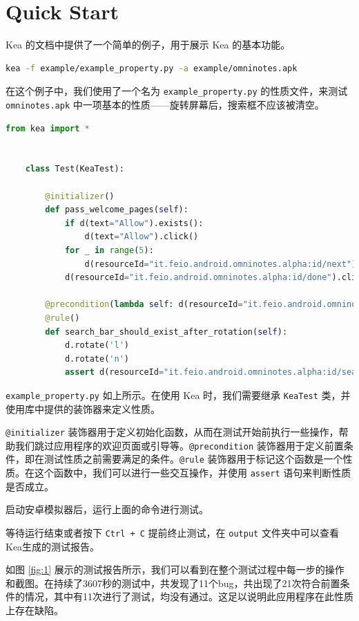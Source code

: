 \documentclass{article}
\begin{document}
\section{Quick Start}

Kea 的文档中提供了一个简单的例子，用于展示 Kea 的基本功能。

\begin{lstlisting}[language=bash]
    kea -f example/example_property.py -a example/omninotes.apk
\end{lstlisting}

在这个例子中，我们使用了一个名为 \texttt{example\_property.py} 的性质文件，来测试 \texttt{omninotes.apk} 中一项基本的性质——旋转屏幕后，搜索框不应该被清空。


\begin{lstlisting}[language=python]
    from kea import *


    class Test(KeaTest): 

        @initializer()
        def pass_welcome_pages(self):
            if d(text="Allow").exists():
                d(text="Allow").click()
            for _ in range(5):
                d(resourceId="it.feio.android.omninotes.alpha:id/next").click()
            d(resourceId="it.feio.android.omninotes.alpha:id/done").click()
    
        @precondition(lambda self: d(resourceId="it.feio.android.omninotes.alpha:id/search_src_text").exists())
        @rule()
        def search_bar_should_exist_after_rotation(self):
            d.rotate('l')
            d.rotate('n')
            assert d(resourceId="it.feio.android.omninotes.alpha:id/search_src_text").exists()
\end{lstlisting}

\texttt{example\_property.py} 如上所示。在使用 Kea 时，我们需要继承 \texttt{KeaTest} 类，并使用库中提供的装饰器来定义性质。

\texttt{@initializer} 装饰器用于定义初始化函数，从而在测试开始前执行一些操作，帮助我们跳过应用程序的欢迎页面或引导等。\texttt{@precondition} 装饰器用于定义前置条件，即在测试性质之前需要满足的条件。\texttt{@rule} 装饰器用于标记这个函数是一个性质。在这个函数中，我们可以进行一些交互操作，并使用 \texttt{assert} 语句来判断性质是否成立。

启动安卓模拟器后，运行上面的命令进行测试。

等待运行结束或者按下 \texttt{Ctrl + C} 提前终止测试，在 \texttt{output} 文件夹中可以查看Kea生成的测试报告。

如图 \ref{fig:1} 展示的测试报告所示，我们可以看到在整个测试过程中每一步的操作和截图。在持续了3607秒的测试中，共发现了11个bug，共出现了21次符合前置条件的情况，其中有11次进行了测试，均没有通过。这足以说明此应用程序在此性质上存在缺陷。
\end{document}
